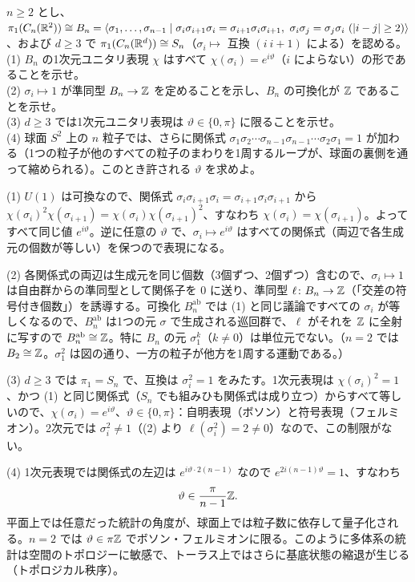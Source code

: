\begin{problem}[難易度 C]\label{ch02-prob-braid}
$n\ge2$ とし、$\pi_1(C_n(\R^2))\cong B_n=\langle\sigma_1,\dots,\sigma_{n-1}\mid\sigma_i\sigma_{i+1}\sigma_i=\sigma_{i+1}\sigma_i\sigma_{i+1},\ \sigma_i\sigma_j=\sigma_j\sigma_i\ (\lvert i-j\rvert\ge2)\rangle$、および $d\ge3$ で $\pi_1(C_n(\mathbb{R}^d))\cong S_n$（$\sigma_i\mapsto$ 互換 $(i\ i{+}1)$ による）を認める。\\
(1) $B_n$ の1次元ユニタリ表現 $\chi$ はすべて $\chi(\sigma_i)=e^{i\vartheta}$（$i$ によらない）の形であることを示せ。\\
(2) $\sigma_i\mapsto1$ が準同型 $B_n\to\mathbb{Z}$ を定めることを示し、$B_n$ の可換化が $\mathbb{Z}$ であることを示せ。\\
(3) $d\ge3$ では1次元ユニタリ表現は $\vartheta\in\{0,\pi\}$ に限ることを示せ。\\
(4) 球面 $S^2$ 上の $n$ 粒子では、さらに関係式 $\sigma_1\sigma_2\cdots\sigma_{n-1}\sigma_{n-1}\cdots\sigma_2\sigma_1=1$ が加わる（1つの粒子が他のすべての粒子のまわりを1周するループが、球面の裏側を通って縮められる）。このとき許される $\vartheta$ を求めよ。
\end{problem}

\begin{solution}
(1) $U(1)$ は可換なので、関係式 $\sigma_i\sigma_{i+1}\sigma_i=\sigma_{i+1}\sigma_i\sigma_{i+1}$ から $\chi(\sigma_i)^2\chi(\sigma_{i+1})=\chi(\sigma_i)\chi(\sigma_{i+1})^2$、すなわち $\chi(\sigma_i)=\chi(\sigma_{i+1})$。よってすべて同じ値 $e^{i\vartheta}$。逆に任意の $\vartheta$ で、$\sigma_i\mapsto e^{i\vartheta}$ はすべての関係式（両辺で各生成元の個数が等しい）を保つので表現になる。

(2) 各関係式の両辺は生成元を同じ個数（3個ずつ、2個ずつ）含むので、$\sigma_i\mapsto1$ は自由群からの準同型として関係子を $0$ に送り、準同型 $\ell\colon B_n\to\mathbb{Z}$（「交差の符号付き個数」）を誘導する。可換化 $B_n^{\mathrm{ab}}$ では (1) と同じ議論ですべての $\sigma_i$ が等しくなるので、$B_n^{\mathrm{ab}}$ は1つの元 $\sigma$ で生成される巡回群で、$\ell$ がそれを $\mathbb{Z}$ に全射に写すので $B_n^{\mathrm{ab}}\cong\mathbb{Z}$。特に $B_n$ の元 $\sigma_1^k$（$k\ne0$）は単位元でない。（$n=2$ では $B_2\cong\mathbb{Z}$。$\sigma_1^2$ は図の通り、一方の粒子が他方を1周する運動である。）

(3) $d\ge3$ では $\pi_1=S_n$ で、互換は $\sigma_i^2=1$ をみたす。1次元表現は $\chi(\sigma_i)^2=1$、かつ (1) と同じ関係式（$S_n$ でも組みひも関係式は成り立つ）からすべて等しいので、$\chi(\sigma_i)=e^{i\vartheta}$、$\vartheta\in\{0,\pi\}$：自明表現（ボソン）と符号表現（フェルミオン）。2次元では $\sigma_i^2\ne1$（(2) より $\ell(\sigma_i^2)=2\ne0$）なので、この制限がない。

(4) 1次元表現では関係式の左辺は $e^{i\vartheta\cdot2(n-1)}$ なので $e^{2i(n-1)\vartheta}=1$、すなわち
\[
\vartheta\in\frac{\pi}{n-1}\mathbb{Z} .
\]
平面上では任意だった統計の角度が、球面上では粒子数に依存して量子化される。$n=2$ では $\vartheta\in\pi\mathbb{Z}$ でボソン・フェルミオンに限る。このように多体系の統計は空間のトポロジーに敏感で、トーラス上ではさらに基底状態の縮退が生じる（トポロジカル秩序）。
\end{solution}

